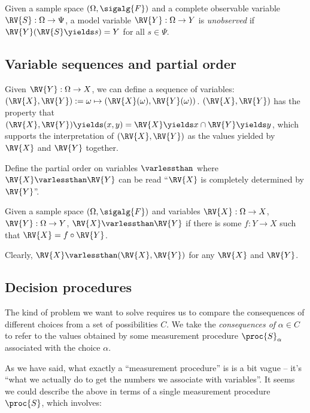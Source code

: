 \begin{definition}\label{def:unobserved_variable}
Given a sample space $(\Omega,\sigalg{F})$ and a complete observable variable $\RV{S}:\Omega\to\Psi$, a model variable $\RV{Y}:\Omega\to Y$ is \emph{unobserved} if $\RV{Y}(\RV{S}\yields s)=Y$ for all $s\in \Psi$.
\end{definition}

\subsection{Variable sequences and partial order}

Given $\RV{Y}:\Omega\to X$, we can define a sequence of variables: $(\RV{X},\RV{Y}):=\omega\mapsto (\RV{X}(\omega),\RV{Y}(\omega))$. $(\RV{X},\RV{Y})$ has the property that $(\RV{X},\RV{Y})\yields (x,y)= \RV{X}\yields x\cap \RV{Y}\yields y$, which supports the interpretation of $(\RV{X},\RV{Y})$ as the values yielded by $\RV{X}$ and $\RV{Y}$ together.

Define the partial order on variables $\varlessthan$ where $\RV{X}\varlessthan \RV{Y}$ can be read ``$\RV{X}$ is completely determined by $\RV{Y}$''.

\begin{definition}\label{def:variable_po}
Given a sample space $(\Omega,\sigalg{F})$ and variables $\RV{X}:\Omega\to X$, $\RV{Y}:\Omega\to Y$, $\RV{X}\varlessthan \RV{Y}$ if there is some $f:Y\to X$ such that $\RV{X}=f\circ \RV{Y}$.
\end{definition}

Clearly, $\RV{X}\varlessthan(\RV{X},\RV{Y})$ for any $\RV{X}$ and $\RV{Y}$.

\subsection{Decision procedures}\label{sec:actions}

The kind of problem we want to solve requires us to compare the consequences of different choices from a set of possibilities $C$. We take the \emph{consequences of} $\alpha\in C$ to refer to the values obtained by some measurement procedure $\proc{S}_\alpha$ associated with the choice $\alpha$.

As we have said, what exactly a ``measurement procedure'' is is a bit vague -- it's ``what we actually do to get the numbers we associate with variables''. It seems we could describe the above in terms of a single measurement procedure $\proc{S}$, which involves:

